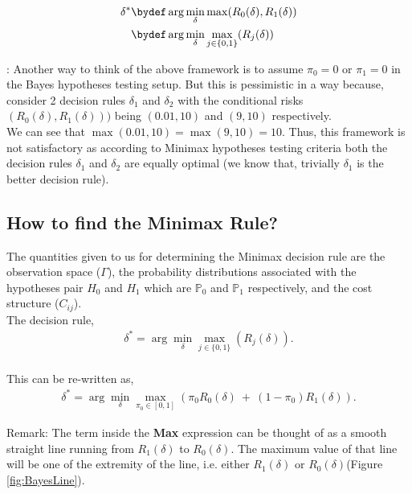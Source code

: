 \documentclass[12pt]{report}
\begin{document}
\begin{align*}
	\delta^{*} &\bydef \arg \min_{\delta} \max(R_0(\delta),R_1(\delta)) \\
	&\bydef \arg \min_{\delta} \max_{j\in\{0,1\}}(R_j(\delta))
\end{align*}


\begin{rem} : Another way to think of the above framework is to assume $\pi_0 = 0$ or $\pi_1 = 0$ in the Bayes hypotheses testing setup. But this is pessimistic in a way because, consider 2 decision rules $\delta_1$ and $\delta_2$ with the conditional risks $(R_0(\delta),R_1(\delta)))$ being $(0.01,10)$ and $(9,10)$ respectively.\\ We can see that $\max(0.01,10) = \max(9,10) = 10$. Thus, this framework is not satisfactory as according to Minimax hypotheses testing criteria both the decision rules $\delta_1$ and $\delta_2$ are equally optimal (we know that, trivially $\delta_1$ is the better decision rule).
\end{rem}
			
	\subsection{How to find the Minimax Rule?}
	The quantities given to us for determining the Minimax decision rule are the observation space ($\Gamma$), the probability distributions associated with the hypotheses pair $H_0$ and $H_1$ which are $\mathbb{P}_0$ and $\mathbb{P}_1$ respectively, and the cost structure ($C_{ij}$).\\
	
	\noindent The decision rule,
	\begin{align*}
		\delta^* = \arg \min_{\delta} \max_{j\in \{0,1\}}(R_j(\delta)).
	\end{align*}
	\\
	This can be re-written as,
	\begin{align}
		\delta^* = \arg \min_{\delta} \max_{\pi_0 \in [0,1]} (\pi_0 R_0(\delta) \: + \: (1-\pi_0) R_1(\delta)).
	\end{align}

	\noindent Remark: The term inside the {\bf Max} expression can be thought of as a smooth straight line running from $R_1(\delta)$ to $R_0(\delta)$. The maximum value of that line will be one of the extremity of the line, i.e. either $R_1(\delta)$ or $R_0(\delta)$(Figure \ref{fig:BayesLine}).\\
	
\end{document}
